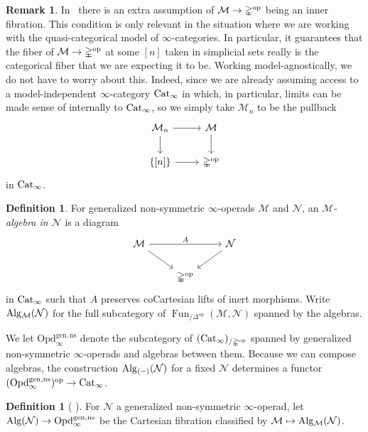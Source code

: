 \documentclass[10pt]{amsart}
\numberwithin{equation}{section}
\theoremstyle{definition}
\newtheorem{definition}[prop]{Definition}
\newtheorem{rem}[prop]{Remark}
\DeclareMathOperator{\Fun}{Fun}
\DeclareMathOperator{\op}{op}
\newcommand{\Cat}{\mathrm{Cat}\vphantom{t}}
\newcommand{\Alg}{\mathrm{Alg}\vphantom{z}}
\newcommand{\Simp}{\mathbb{\Delta}}
\newcommand{\cN}{\mathcal{N}}
\newcommand{\cM}{\mathcal{M}}
\newcommand{\Opd}{\mathrm{Opd}^{\mathrm{gen,ns}}_{\infty}}
\renewcommand{\to}{\mathchoice{\longrightarrow}{\rightarrow}{}{}}
\begin{document}
	\begin{rem}\label{rem:inner_fib}
		In~\cite*[Definition 2.4.1]{GH} there is an extra assumption of $\cM \to \Simp^{\op}$ being an inner fibration.
		This condition is only relevant in the situation where we are working with the quasi-categorical model of $\infty$-categories.
		In particular, it guarantees that the fiber of $\cM\to \Simp^{\op}$ at some $[n]$ taken in simplicial sets really is the categorical fiber that we are expecting it to be.
		Working model-agnostically, we do not have to worry about this.
		Indeed, since we are already assuming access to a model-independent $\infty$-category $\Cat_{\infty}$ in which, in particular, limits can be made sense of internally to $\Cat_{\infty}$, so we simply take $\cM_{n}$ to be the pullback
		\[
		\begin{tikzcd}
			\cM_{n} \arrow[r] \arrow[d] & \cM \arrow[d] \\
			\{[n]\} \arrow[r] & \Simp^{\op}
		\end{tikzcd}
		\]
		in $\Cat_{\infty}$.
	\end{rem}

	\begin{definition}\label{def:algebra}
		For generalized non-symmetric $\infty$-operads $\cM$ and $\cN$, an \emph{$\cM$-algebra in $\cN$} is a diagram
		\begin{equation*}
			\begin{tikzcd}
				\cM \arrow[rr, "A"] \arrow[dr] && \cN \arrow[dl] \\
				&\Simp^{\op} &
			\end{tikzcd}
		\end{equation*}
		in $\Cat_{\infty}$ such that $A$ preserves coCartesian lifts of inert morphisms. Write $\Alg_{\cM}(\cN)$ for the full subcategory of $\Fun_{/\Simp^{\op}}(\cM, \cN)$ spanned by the algebras.
	\end{definition}

	We let $\Opd$ denote the subcategory of $(\Cat_{\infty})_{/\Simp^{\op}}$ spanned by generalized non-symmetric $\infty$-operads and algebras between them.
	Because we can compose algebras, the construction $\Alg_{(-)}(\cN)$ for a fixed $\cN$ determines a functor $(\Opd)^{\op} \to \Cat_{\infty}$.

	\begin{definition}[{\cite*[Definition 3.6.1]{GH} }] \label{def:algebra_fibration}
		For $\cN$ a generalized non-symmetric $\infty$-operad, let $\Alg(\cN) \to \Opd$ be the Cartesian fibration classified by $\cM \mapsto \Alg_{\cM}(\cN)$.
	\end{definition}
\end{document}
